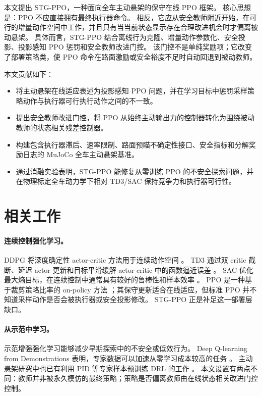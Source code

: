 \documentclass[UTF8,letterpaper,twocolumn]{ctexart}
\begin{document}
本文提出 STG-PPO，一种面向全车主动悬架的保守在线 PPO 框架。
核心思想是：PPO 不应直接拥有最终执行器命令。
相反，它应从安全教师附近开始，在可行的增量动作空间中工作，并且只有当当前状态显示存在合理改进机会时才偏离被动悬架。
具体而言，STG-PPO 结合离线行为克隆、增量动作参数化、安全投影、投影感知 PPO 惩罚和安全教师改进门控。
该门控不是单纯奖励项；它改变了部署策略类，使 PPO 命令在路面激励或安全裕度不足时自动回退到被动教师。

本文贡献如下：
\begin{itemize}
    \item 将主动悬架在线适应表述为投影感知 PPO 问题，并在学习目标中惩罚采样策略动作与执行器可行执行动作之间的不一致。
    \item 提出安全教师改进门控，将 PPO 从始终主动输出力的控制器转化为围绕被动教师的状态相关残差控制器。
    \item 构建包含执行器滞后、速率限制、路面预瞄不确定性接口、安全指标和分解奖励日志的 MuJoCo 全车主动悬架基准。
    \item 通过消融实验表明，STG-PPO 能修复从零训练 PPO 的不安全探索问题，并在物理标定全车动力学下相对 TD3/SAC 保持竞争力和执行器可行性。
\end{itemize}

\section{相关工作}

\paragraph{连续控制强化学习。}
DDPG 将深度确定性 actor-critic 方法用于连续动作空间 \citep{lillicrap2015ddpg}。
TD3 通过双 critic 截断、延迟 actor 更新和目标平滑缓解 actor-critic 中的函数逼近误差 \citep{fujimoto2018td3}。
SAC 优化最大熵目标，在连续控制中通常具有较好的鲁棒性和样本效率 \citep{haarnoja2018sac}。
PPO 是一种基于裁剪策略比率的 on-policy 方法 \citep{schulman2017ppo}；其保守更新适合在线适应，但标准 PPO 并不知道采样动作是否会被执行器或安全投影修改。
STG-PPO 正是补足这一部署层缺口。

\paragraph{从示范中学习。}
示范增强强化学习能够减少早期探索中的不安全或低效行为。
Deep Q-learning from Demonstrations 表明，专家数据可以加速从零学习成本较高的任务 \citep{hester2018dqfd}。
主动悬架研究中也已有利用 PID 等专家样本预训练 DRL 的工作 \citep{tan2024active_demo}。
本文设置有两点不同：教师并非被永久模仿的最终策略；策略是否偏离教师由在线状态相关改进门控控制。
\end{document}

